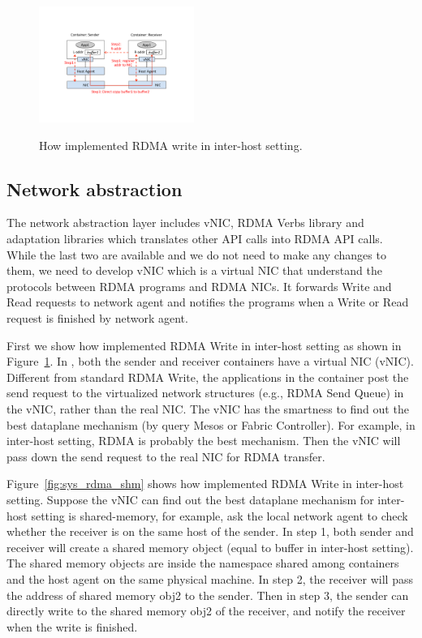      \begin{figure}[th]
     \centering 
     \includegraphics[width=0.45\textwidth]{figures/system/sys_rdma_rdma.pdf}
     \label{fig:sys_rdma_rdma}
     \caption{How \sysname implemented RDMA write in inter-host setting.} 
     \end{figure}


\subsection{Network abstraction}
The network abstraction layer includes vNIC, RDMA Verbs library and adaptation
libraries which translates other API calls into RDMA API calls. 
While the last two are available and we do not need to make any changes to them,
we need to develop vNIC which is a virtual NIC that understand the protocols
between RDMA programs and RDMA NICs. It forwards Write and Read requests to 
network agent and notifies the programs when a Write or Read request is finished
by network agent. 

\iffalse
{} First we show 
how \sysname implemented RDMA Write in inter-host setting
as shown in Figure~\ref{fig:sys_rdma_rdma}. 
In \sysname, both the sender and receiver containers have a virtual NIC (vNIC).
Different from standard RDMA Write, the applications in the container post
the send request to the virtualized network structures (e.g., RDMA Send Queue)
in the vNIC, rather than the real NIC.
The vNIC has the smartness to find out the best dataplane mechanism (by query
Mesos or Fabric Controller).
For example, in inter-host setting, RDMA is probably the best mechanism. Then
the vNIC will pass down the send request to the real NIC for RDMA transfer.


 Figure~\ref{fig:sys_rdma_shm} shows 
how \sysname implemented RDMA Write in inter-host setting.
Suppose the vNIC can find out the best dataplane mechanism for inter-host setting
is shared-memory, for example, ask the local network agent to check whether the 
receiver is on the same host of the sender.
 In step 1, both sender and receiver will create a shared memory object (equal 
to buffer in inter-host setting). The shared memory objects are inside the namespace
shared among containers and the host agent on the same physical machine.
In step 2, the receiver will pass the address of shared memory obj2 to the sender.
Then in step 3, the sender can directly write to the shared memory obj2 of the
receiver, and notify the receiver when the write is finished.



